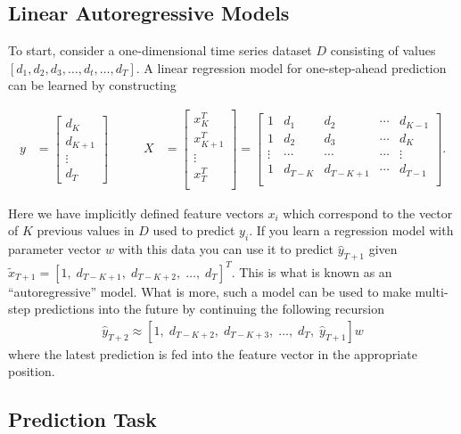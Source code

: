 \subsection*{Linear Autoregressive Models}

To start, consider a one-dimensional time series dataset $D$ consisting of values $[d_1, d_2, d_3, \ldots, d_t, \ldots, d_T]$.  A linear regression model for one-step-ahead prediction can be learned by constructing

\begin{align*}
y &= \begin{bmatrix}
d_K \\ d_{K+1}\\ \vdots\\ d_T
\end{bmatrix} &\qquad
X &= 
\begin{bmatrix}
x_K^T \\
x_{K+1}^T \\
\vdots \\
x_{T}^T \\
\end{bmatrix}
 =
\begin{bmatrix}
1 & d_1 & d_2 & \cdots & d_{K-1}\\
1 & d_2 & d_3 &  \cdots & d_{K}\\
\vdots & \cdots &\cdots &\cdots &\vdots\\
1 & d_{T-K} & d_{T-K+1} &  \cdots & d_{T-1}\\
\end{bmatrix}.	
\end{align*}

Here we have implicitly defined feature vectors $x_i$ which correspond to the vector of $K$ previous values in $D$ used to predict $y_i.$
If you learn a regression model with parameter vector $w$ with this data you can use it to predict ${\hat y}_{T+1}$ given ${\tilde x}_{T+1} = [1,\; d_{T-K+1},\; d_{T-K+2},\;  \ldots,\;  d_{T}]^T$. This is what is known as an ``autoregressive'' model.  What is more, such a model can be used to make multi-step predictions into the future by continuing the following recursion 
\begin{align*}
    {\hat y}_{T+2} \approx [1,\; d_{T-K+2},\; d_{T-K+3},\;  \ldots,\;  d_{T},\; {\hat y}_{T+1}]w
\end{align*}
where the latest prediction is fed into the feature vector in the appropriate position.

\subsection*{Prediction Task}



